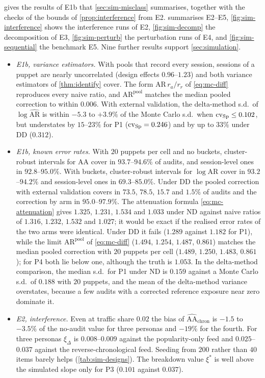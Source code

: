  gives the results of E1b that \cref{sec:sim-misclass} summarises, together with the checks of the bounds of \cref{prop:interference} from E2.  summarises E2--E5, \cref{fig:sim-interference} shows the interference runs of E2, \cref{fig:sim-decomp} the decomposition of E3, \cref{fig:sim-perturb} the perturbation runs of E4, and \cref{fig:sim-sequential} the benchmark E5. Nine further results support \cref{sec:simulation}.
\begin{itemize}
  \item \emph{E1b, variance estimators.} With pools that record every session, sessions of a puppet are nearly uncorrelated (design effects $0.96$--$1.23$) and both variance estimators of \cref{thm:identify} cover. The form $\mathrm{AR}\,r_a/r_r$ of \eqref{eq:mc-diff} reproduces every naive ratio, and $\mathrm{AR}^{\mathrm{pool}}$ matches the median pooled correction to within $0.006$. With external validation, the delta-method s.d.\ of $\log\widehat{\mathrm{AR}}$ is within $-5.3$ to $+3.9\%$ of the Monte Carlo s.d.\ when $\mathrm{cv}_{\mathrm{Sp}}\le0.102$, but understates by $15$--$23\%$ for P1 ($\mathrm{cv}_{\mathrm{Sp}}=0.246$) and by up to $33\%$ under DD ($0.312$).
  \item \emph{E1b, known error rates.} With $20$ puppets per cell and no buckets, cluster-robust intervals for $\mathrm{AA}$ cover in $93.7$--$94.6\%$ of audits, and session-level ones in $92.8$--$95.0\%$. With buckets, cluster-robust intervals for $\log\mathrm{AR}$ cover in $93.2$--$94.2\%$ and session-level ones in $69.3$--$85.0\%$. Under DD the pooled correction with external validation covers in $73.5$, $78.5$, $15.7$ and $1.5\%$ of audits and the correction by arm in $95.0$--$97.9\%$. The attenuation formula \eqref{eq:mc-attenuation} gives $1.325$, $1.231$, $1.534$ and $1.033$ under ND against naive ratios of $1.316$, $1.232$, $1.532$ and $1.027$; it would be exact if the realised error rates of the two arms were identical. Under DD it fails ($1.289$ against $1.182$ for P1), while the limit $\mathrm{AR}^{\mathrm{pool}}$ of \eqref{eq:mc-diff} ($1.494$, $1.254$, $1.487$, $0.861$) matches the median pooled correction with $20$ puppets per cell ($1.489$, $1.250$, $1.483$, $0.861$); for P4 both lie below one, although the truth is $1.053$. In the delta-method comparison, the median s.d.\ for P1 under ND is $0.159$ against a Monte Carlo s.d.\ of $0.188$ with $20$ puppets, and the mean of the delta-method variance overstates, because a few audits with a corrected reference exposure near zero dominate it.
  \item \emph{E2, interference.} Even at traffic share $0.02$ the bias of $\widehat{\mathrm{AA}}_{\mathrm{chron}}$ is $-1.5$ to $-3.5\%$ of the no-audit value for three personas and $-19\%$ for the fourth. For three personas $\xi_\Delta$ is $0.008$--$0.009$ against the popularity-only feed and $0.025$--$0.037$ against the reverse-chronological feed. Seeding from $200$ rather than $40$ items barely helps (\cref{tab:sim-designs}). The breakdown value $\xi^\ast$ is well above the simulated slope only for P3 ($0.101$ against $0.037$).

\end{itemize}
